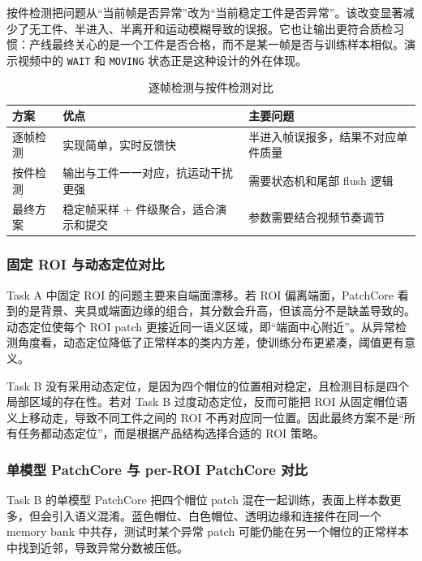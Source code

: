 \documentclass[12pt,hyperref,a4paper,UTF8,fontset=fandol]{ctexart}
\begin{document}
按件检测把问题从“当前帧是否异常”改为“当前稳定工件是否异常”。该改变显著减少了无工件、半进入、半离开和运动模糊导致的误报。它也让输出更符合质检习惯：产线最终关心的是一个工件是否合格，而不是某一帧是否与训练样本相似。演示视频中的 \texttt{WAIT} 和 \texttt{MOVING} 状态正是这种设计的外在体现。

\begin{table}[H]
    \centering
    \begin{tabular}{p{}p{}p{}}
        \toprule
        方案 & 优点 & 主要问题 \\
        \midrule
        逐帧检测 & 实现简单，实时反馈快 & 半进入帧误报多，结果不对应单件质量 \\
        按件检测 & 输出与工件一一对应，抗运动干扰更强 & 需要状态机和尾部 flush 逻辑 \\
        最终方案 & 稳定帧采样 + 件级聚合，适合演示和提交 & 参数需要结合视频节奏调节 \\
        \bottomrule
    \end{tabular}
    \caption{逐帧检测与按件检测对比}
\end{table}

\subsubsection{固定 ROI 与动态定位对比}

Task A 中固定 ROI 的问题主要来自端面漂移。若 ROI 偏离端面，PatchCore 看到的是背景、夹具或端面边缘的组合，其分数会升高，但该高分不是缺盖导致的。动态定位使每个 ROI patch 更接近同一语义区域，即“端面中心附近”。从异常检测角度看，动态定位降低了正常样本的类内方差，使训练分布更紧凑，阈值更有意义。

Task B 没有采用动态定位，是因为四个帽位的位置相对稳定，且检测目标是四个局部区域的存在性。若对 Task B 过度动态定位，反而可能把 ROI 从固定帽位语义上移动走，导致不同工件之间的 ROI 不再对应同一位置。因此最终方案不是“所有任务都动态定位”，而是根据产品结构选择合适的 ROI 策略。

\subsubsection{单模型 PatchCore 与 per-ROI PatchCore 对比}

Task B 的单模型 PatchCore 把四个帽位 patch 混在一起训练，表面上样本数更多，但会引入语义混淆。蓝色帽位、白色帽位、透明边缘和连接件在同一个 memory bank 中共存，测试时某个异常 patch 可能仍能在另一个帽位的正常样本中找到近邻，导致异常分数被压低。
\end{document}
